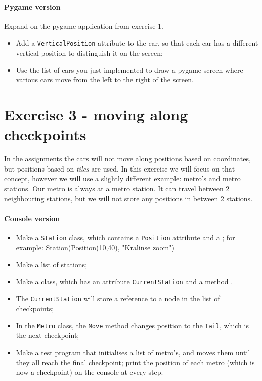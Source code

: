 \documentclass[12pt,a4paper]{article}
\begin{document}
		\paragraph*{Pygame version}
		    Expand on the pygame application from exercise 1.

			\begin{itemize}
				\item Add a \texttt{VerticalPosition} attribute to the car, so that each car has a different vertical position to distinguish it on the screen;
				\item Use the list of cars you just implemented to draw a pygame screen where various cars move from the left to the right of the screen.
			\end{itemize}

	\section{Exercise 3 - moving along checkpoints}
	    In the assignments the cars will not move along positions based on coordinates, but positions based on \textit{tiles} are used.
	    In this exercise we will focus on that concept, however we will use a slightly different example: metro's and metro stations.
	    Our metro is always at a metro station. It can travel between 2 neighbouring stations, but we will not store any positions in between 2 stations.

		\paragraph*{Console version}
			\begin{itemize}
				\item Make a \texttt{Station} class,
                        which contains a \texttt{Position} attribute and a ;
                        for example: Station(Position(10,40), "Kralinse zoom")
				\item Make a list of stations;
				\item Make a  class,
                        which has an attribute \texttt{CurrentStation} and a method .
				\item The \texttt{CurrentStation} will store a reference to a node in the list of checkpoints;
				\item In the \texttt{Metro} class, the \texttt{Move} method changes position to the \texttt{Tail}, which is the next checkpoint;
				\item Make a test program that initialises a list of metro's, and moves them until they all reach the final checkpoint; print the position of each metro (which is now a checkpoint) on the console at every step.
			\end{itemize}
\end{document}
